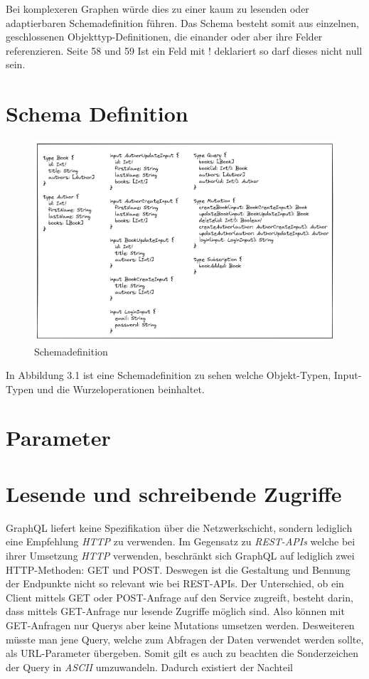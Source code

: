 Bei komplexeren Graphen würde dies zu einer kaum zu lesenden oder adaptierbaren Schemadefinition führen.
Das Schema besteht somit aus einzelnen, geschlossenen Objekttyp-Definitionen, die einander oder aber ihre Felder referenzieren. Seite 58 und 59
Ist ein Feld mit ! deklariert so darf dieses nicht null sein.

\section{Schema Definition}

\begin{figure}[H]
    \includegraphics[width=\textwidth]{pics/schema.png}
    \caption{Schemadefinition}
\end{figure}

In Abbildung 3.1 ist eine Schemadefinition zu sehen welche Objekt-Typen, Input-Typen und die Wurzeloperationen beinhaltet.

\section{Parameter}

\section{Lesende und schreibende Zugriffe}
GraphQL liefert keine Spezifikation über die Netzwerkschicht, sondern lediglich eine Empfehlung \textit{HTTP} zu verwenden.
Im Gegensatz zu \textit{REST-APIs} welche bei ihrer Umsetzung \textit{HTTP} verwenden, beschränkt sich GraphQL auf lediglich zwei HTTP-Methoden: GET und POST.
Deswegen ist die Gestaltung und Bennung der Endpunkte nicht so relevant wie bei REST-APIs.
\newline
Der Unterschied, ob ein Client mittels GET oder POST-Anfrage auf den Service zugreift, besteht darin, dass mittels GET-Anfrage nur lesende Zugriffe möglich sind.
Also können mit GET-Anfragen nur Querys aber keine Mutations umsetzen werden.
Desweiteren müsste man jene Query, welche zum Abfragen der Daten verwendet werden sollte, als URL-Parameter übergeben.
Somit gilt es auch zu beachten die Sonderzeichen der Query in \textit{ASCII} umzuwandeln.
Dadurch existiert der Nachteil



